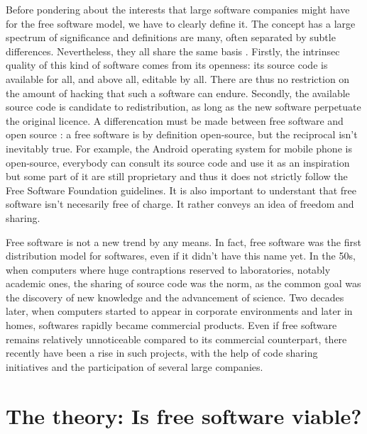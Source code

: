 \documentclass[12pt]{article}
\begin{document}
Before pondering about the interests that large software companies
might have for the free software model, we have to clearly define
it. The concept has a large spectrum of significance and definitions
are many, often separated by subtle differences. Nevertheless, they
all share the same basis \cite{sers}. Firstly, the intrinsec quality
of this kind of software comes from its openness: its source code is
available for all, and above all, editable by all. There are thus no
restriction on the amount of hacking that such a software can endure. Secondly,
the available source code is candidate to redistribution, as long as
the new software perpetuate the original licence. A differencation must
be made between free software and open source : a free software is by
definition open-source, but the reciprocal isn't inevitably true. For
example, the Android operating system for mobile phone is open-source,
everybody can consult its source code and use it as an
inspiration but some part of it are still proprietary and thus it does not strictly follow the
Free Software Foundation guidelines. It is also important to understant that free software isn't
necesarily free of charge. It rather conveys an idea of freedom and sharing.

Free software is not a new trend by any means. In fact, free software
was the first distribution model for softwares, even if it didn't have
this name yet. In the 50s, when computers where huge contraptions
reserved to laboratories, notably academic ones, the sharing of source
code was the norm, as the common goal was the discovery of new knowledge and the
advancement of science. Two decades later, when computers started to
appear in corporate environments and later in homes, softwares rapidly
became commercial products. Even if free software remains relatively unnoticeable
compared to its commercial counterpart, there recently have been a
rise in such projects, with the help of code sharing initiatives and
the participation of several large companies.

\section{The theory: Is free software viable?}
\end{document}
